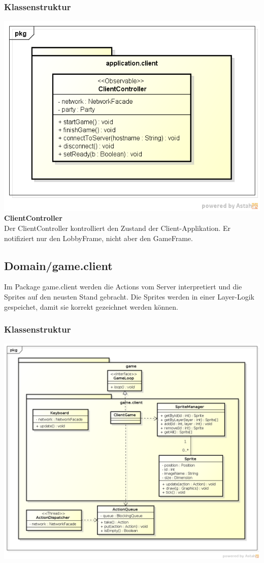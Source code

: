 \documentclass[11pt]{scrartcl}
\begin{document}
\subsubsection{Klassenstruktur}
\includegraphics[scale=0.75]{ClassDiagramApplicationClient}
\newpage
\textbf{ClientController}\\
Der ClientController kontrolliert den Zustand der Client-Applikation. Er notifiziert nur den LobbyFrame, nicht aber den GameFrame.\\



\newpage
\subsection{Domain/game.client}
Im Package game.client werden die Actions vom Server interpretiert und die Sprites auf den neusten Stand gebracht. Die Sprites werden in einer Layer-Logik gespeichet, damit sie korrekt gezeichnet werden können.

\subsubsection{Klassenstruktur}
\includegraphics[scale=0.5]{ClassDiagramGameClient}
\end{document}
